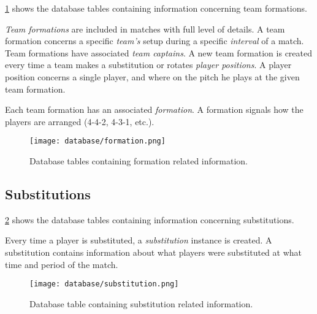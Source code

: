 \cref{fig:database-formations} shows the database tables containing information concerning team formations.

\textit{Team formations} are included in matches with full level of details. A team formation concerns a specific \textit{team's} setup during a specific \textit{interval} of a match. Team formations have associated \textit{team captains}. A new team formation is created every time a team makes a substitution or rotates \textit{player positions}. A player position concerns a single player, and where on the pitch he plays at the given team formation.

Each team formation has an associated \textit{formation}. A formation signals how the players are arranged (4-4-2, 4-3-1, etc.).

\begin{figure}
    \centering
    \texttt{[image: database/formation.png]}
    \caption{Database tables containing formation related information.}
    \label{fig:database-formations}
\end{figure}


\subsection{Substitutions}

\cref{fig:database-substitutions} shows the database tables containing information concerning substitutions.

Every time a player is substituted, a \textit{substitution} instance is created. A substitution contains information about what players were substituted at what time and period of the match.

\begin{figure}
    \centering
    \texttt{[image: database/substitution.png]}
    \caption{Database table containing substitution related information.}
    \label{fig:database-substitutions}
\end{figure}